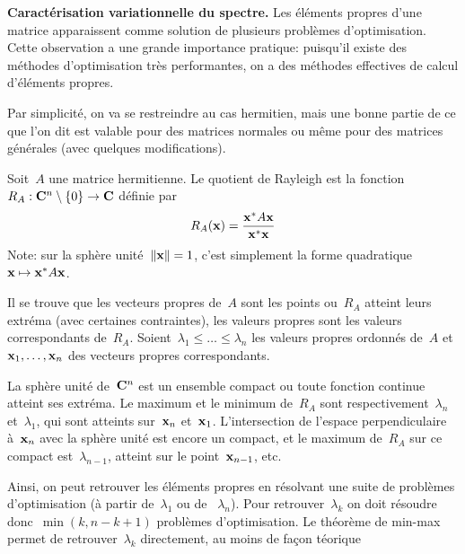 
{\bf Caractérisation variationnelle du spectre.}
Les éléments propres d'une matrice apparaissent comme solution de plusieurs
problèmes d'optimisation.  Cette observation a une grande importance
pratique: puisqu'il existe des méthodes d'optimisation très performantes,
on a des méthodes effectives de calcul d'éléments propres.

Par simplicité, on va se restreindre au cas hermitien, mais une bonne partie
de ce que l'on dit est valable pour des matrices normales ou même pour des
matrices générales (avec quelques modifications).

\begin{definition}
	Soit~$A$ une matrice hermitienne.  Le quotient de Rayleigh est la
	fonction~$R_A:\mathbf{C}^n\setminus\{0\}\to\mathbf{C}$ définie par
	\[
		R_A(\mathbf{x})=\frac{\mathbf{x}^*A\mathbf{x}}{\mathbf{x}^*\mathbf{x}}
	\]
	Note: sur la sphère unité~$\left\|\mathbf{x}\right\|=1$, c'est
	simplement la forme quadratique~$\mathbf{x}\mapsto\mathbf{x}^*A\mathbf{x}$.
\end{definition}

Il se trouve que les vecteurs propres de~$A$ sont les points ou~$R_A$
atteint leurs extréma (avec certaines contraintes), les valeurs propres sont
les valeurs correspondants de~$R_A$.  Soient~$\lambda_1\le\ldots\le\lambda_n$
les valeurs propres ordonnés de~$A$ et~$\mathbf{x}_1,\ldots,\mathbf{x}_n$ des vecteurs
propres correspondants.

\begin{proposition}
	La sphère unité de~$\mathbf{C}^n$ est un ensemble compact ou toute fonction
	continue atteint ses extréma.  Le maximum et le minimum de~$R_A$ sont
	respectivement~$\lambda_n$ et~$\lambda_1$, qui sont atteints sur~$\mathbf{x}_n$
	et~$\mathbf{x}_1$.  L'intersection de l'espace perpendiculaire à~$\mathbf{x}_n$ avec la
	sphère unité est encore un compact, et le maximum de~$R_A$ sur ce compact
	est~$\lambda_{n-1}$, atteint sur le point~$\mathbf{x}_{n-1}$, etc.
\end{proposition}

Ainsi, on peut retrouver les éléments propres en résolvant une suite de
problèmes d'optimisation (à partir de~$\lambda_1$ ou de ~$\lambda_n$).
Pour retrouver~$\lambda_k$ on doit résoudre donc~$\min(k,n-k+1)$ problèmes
d'optimisation.  Le théorème de min-max permet de retrouver~$\lambda_k$
directement, au moins de façon téorique

